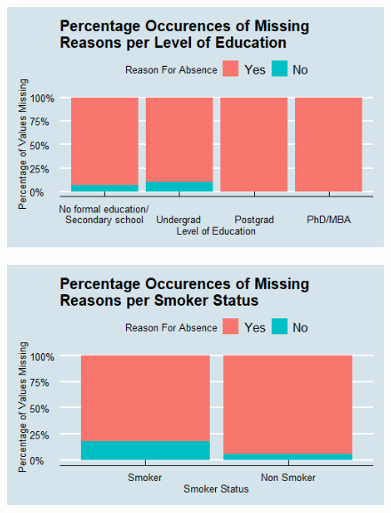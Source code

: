 \begin{figure}[h]
\centering
\begin{minipage}{.5\textwidth}
  \centering
  \includegraphics[width=.9\linewidth]{images/plot_missing_edu.png}
  \label{fig:plot_missing_edu}
\end{minipage}%
\begin{minipage}{.5\textwidth}
  \centering
  \includegraphics[width=.9\linewidth]{images/plot_missing_smoker.png}
  \label{fig:plot_missing_smoker}
\end{minipage}
\end{figure}

